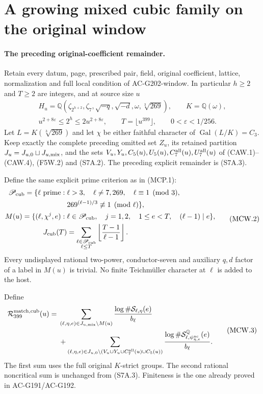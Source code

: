 \section{A growing mixed cubic family on the original window}
\label{sec:mixed-cubic-split-prime-window}

\paragraph{The preceding original-coefficient remainder.}
Retain every datum, page, prescribed pair, field, original coefficient,
lattice, normalization and full local condition of AC-G202-window.
In particular $h\geq2$ and $T\geq2$ are integers, and at source size $u$
\[
 \begin{gathered}
 H_u=\mathbb Q(\zeta_{2^{h+2}},\zeta_7,\sqrt{-q},\sqrt{-d},
                  \omega,\sqrt[3]{269}),\qquad K=\mathbb Q(\omega),\\
 u^{2+8\varepsilon}\leq2^h\leq2u^{2+8\varepsilon},\qquad
 T=\lfloor u^{399}\rfloor,\qquad0<\varepsilon<1/256.
 \end{gathered}\tag{MCW.1}
\]
Let $L=K(\sqrt[3]{269})$ and let $\chi$ be either faithful
character of $\operatorname{Gal}(L/K)=C_3$.
Keep exactly the complete preceding omitted set $Z_u$, its
retained partition $J_u=J_{u,0}\sqcup J_{u,\rm mix}$, and the
sets $V_u,Y_u,C_5(u),U_5(u),C_7^{\rm all}(u),U_7^{\rm all}(u)$
of (CAW.1)--(CAW.4), (F5W.2) and (S7A.2).
The preceding explicit remainder is (S7A.3).

Define the same explicit prime criterion as in (MCP.1):
\[
 \begin{split}
 \mathscr P_{\rm cub}=\{\ell\text{ prime}:{}&\ell>3,\quad
       \ell\ne7,269,\quad\ell\equiv1\pmod3,\\
       &269^{(\ell-1)/3}\not\equiv1\pmod\ell\},\\
 M(u)=\{(\ell,\chi^j,e):{}&\ell\in\mathscr P_{\rm cub},\quad
                 j=1,2,\quad1\leq e<T,\quad(\ell-1)\mid e\},\\
 J_{\rm cub}(T)&=\sum_{\substack{\ell\in\mathscr P_{\rm cub}\\\ell\leq T}}
                     \left\lfloor\frac{T-1}{\ell-1}\right\rfloor.
 \end{split}\tag{MCW.2}
\]
Every undisplayed rational two-power, conductor-seven and auxiliary
$q,d$ factor of a label in $M(u)$ is trivial. No finite
Teichm\"uller character at $\ell$ is added to the host.

Define
\[
 \begin{split}
 \mathcal R_{399}^{\rm match,cub}(u)={}&
 \sum_{(\ell,\eta,e)\in J_{u,\rm mix}\setminus M(u)}
                     \frac{\log\#\mathcal S_{\ell,\eta}(e)}{b_\ell}\\
 &+\sum_{(\ell,\eta,e)\in
     J_{u,0}\setminus(V_u\cup Y_u\cup C_7^{\rm all}(u)\cup C_5(u))}
       \frac{\log\#\mathcal S^{\mathbb Q}_{\ell,
                                \psi_{\eta,e}^{\rm nc}}(e)}{b_\ell}.
 \end{split}\tag{MCW.3}
\]
The first sum uses the full original $K$-strict groups. The second
rational noncritical sum is unchanged from (S7A.3).
Finiteness is the one already proved in AC-G191/AC-G192.

